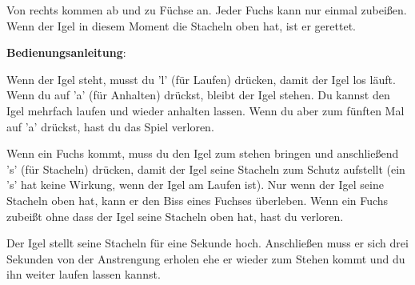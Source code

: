 Von rechts kommen ab und zu Füchse an. Jeder Fuchs kann nur einmal zubeißen.
Wenn der Igel in diesem Moment die Stacheln oben hat, ist er gerettet.

\textbf{Bedienungsanleitung}:

Wenn der Igel steht, musst du 'l' (für Laufen) drücken, damit der Igel los
läuft. Wenn du auf 'a' (für Anhalten) drückst, bleibt der Igel stehen. Du
kannst den Igel mehrfach laufen und wieder anhalten lassen. Wenn du aber zum
fünften Mal auf 'a' drückst, hast du das Spiel verloren.

Wenn ein Fuchs kommt, muss du den Igel zum stehen bringen und anschließend 's'
(für Stacheln) drücken, damit der Igel seine Stacheln zum Schutz aufstellt (ein
's' hat keine Wirkung, wenn der Igel am Laufen ist). Nur wenn der Igel seine
Stacheln oben hat, kann er den Biss eines Fuchses überleben. Wenn ein Fuchs
zubeißt ohne dass der Igel seine Stacheln oben hat, hast du verloren.

Der Igel stellt seine Stacheln für eine Sekunde hoch. Anschließen muss er sich
drei Sekunden von der Anstrengung erholen ehe er wieder zum Stehen kommt und du
ihn weiter laufen lassen kannst.
